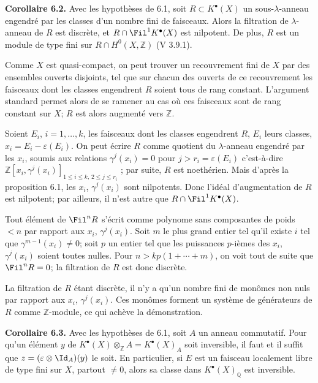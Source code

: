 \textbf{Corollaire 6.2.} Avec les hypothèses de 6.1, soit $R\subset K^{\bullet}(X)$ un sous-$\lambda$-anneau engendré par les classes d'un nombre fini de faisceaux. Alors la filtration de $\lambda$-anneau de $R$ est discrète, et $R\cap\Fil^1K^{\bullet}(X)$ est nilpotent. De plus, $R$ est un module de type fini sur $R\cap H^0(X,\mathbb Z)$ (V 3.9.1).

Comme $X$ est quasi-compact, on peut trouver un recouvrement fini de $X$ par des ensembles ouverts disjoints, tel que sur chacun des ouverts de ce recouvrement les faisceaux dont les classes engendrent $R$ soient tous de rang constant. L'argument standard permet alors de se ramener au cas où ces faisceaux sont de rang constant sur $X$; $R$ est alors augmenté vers $\mathbb Z$.

Soient $E_i$, $i=1,\ldots,k$, les faisceaux dont les classes engendrent $R$, $E_i$ leurs classes, $x_i=E_i-\varepsilon(E_i)$. On peut écrire $R$ comme quotient du $\lambda$-anneau engendré par les $x_i$, soumis aux relations $\gamma^j(x_i)=0$ pour $j>r_i=\varepsilon(E_i)$ c'est-à-dire $\mathbb Z[x_i,\gamma^j(x_i)]_{1\le i\le k,\,2\le j\le r_i}$ ; par suite, $R$ est noethérien. Mais d'après la proposition 6.1, les $x_i$, $\gamma^j(x_i)$ sont nilpotents. Donc l'idéal d'augmentation de $R$ est nilpotent; par ailleurs, il n'est autre que $R\cap\Fil^1K^{\bullet}(X)$.

Tout élément de $\Fil^n R$ s'écrit comme polynome sans composantes de poids $<n$ par rapport aux $x_i$, $\gamma^j(x_i)$. Soit $m$ le plus grand entier tel qu'il existe $i$ tel que $\gamma^{m-1}(x_i)\ne0$; soit $p$ un entier tel que les puissances $p$-ièmes des $x_i$, $\gamma^j(x_i)$ soient toutes nulles. Pour $n>kp(1+\cdots+m)$, on voit tout de suite que $\Fil^nR=0$; la filtration de $R$ est donc discrète.

La filtration de $R$ étant discrète, il n'y a qu'un nombre fini de monômes non nuls par rapport aux $x_i$, $\gamma^j(x_i)$. Ces monômes forment un système de générateurs de $R$ comme $\mathbb Z$-module, ce qui achève la démonstration.

\textbf{Corollaire 6.3.} Avec les hypothèses de 6.1, soit $A$ un anneau commutatif. Pour qu'un élément $y$ de $K^{\bullet}(X)\otimes_{\mathbb Z}A=K^{\bullet}(X)_A$ soit inversible, il faut et il suffit que $z=(\varepsilon\otimes\Id_A)(y)$ le soit. En particulier, si $E$ est un faisceau localement libre de type fini sur $X$, partout $\ne0$, alors sa classe dans $K^{\bullet}(X)_{\mathbb Q}$ est inversible.

